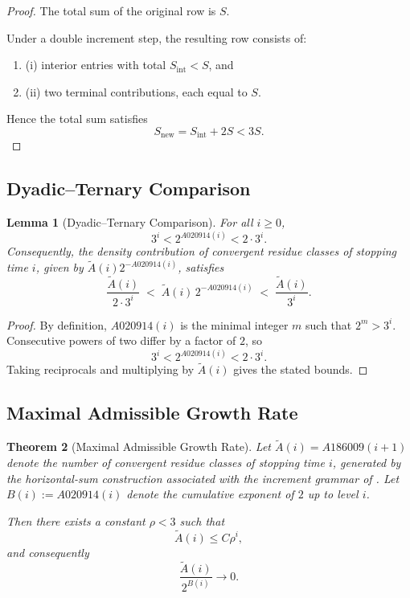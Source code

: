 \documentclass[12pt, oneside]{article}
\numberwithin{equation}{section}
\theoremstyle{definition}
\theoremstyle{plain}
\newtheorem{theorem}{Theorem}[section]
\newtheorem{lemma}[theorem]{Lemma}
\theoremstyle{remark}
\begin{document}
\newpage
\begin{proof}
The total sum of the original row is $S$.

Under a double increment step, the resulting row consists of:
\begin{enumerate}
    \item (i) interior entries with total $S_{\mathrm{int}} < S$, and
    \item (ii) two terminal contributions, each equal to $S$.
\end{enumerate}

Hence the total sum satisfies
\[
S_{\mathrm{new}} = S_{\mathrm{int}} + 2S < 3S.
\]
\end{proof}

\subsection{Dyadic–Ternary Comparison}
\begin{lemma}[Dyadic–Ternary Comparison]
\label{lem:uniform-control}
For all $i \ge 0$,
\[
3^i < 2^{A020914(i)} < 2\cdot 3^i.
\]
Consequently, the density contribution of convergent residue classes of
stopping time $i$, given by \(\widetilde A(i) 2^{-A020914(i)}\), satisfies
\[
\frac{\widetilde A(i)}{2 \cdot 3^i}
\;<\;
\widetilde A(i)\,2^{-A020914(i)}
\;<\;
\frac{\widetilde A(i)}{3^i}.
\]
\end{lemma}

\begin{proof}
By definition, $A020914(i)$ is the minimal integer $m$ such that $2^m > 3^i$.
Consecutive powers of two differ by a factor of $2$, so
\[
3^i < 2^{A020914(i)} < 2 \cdot 3^i.
\]
Taking reciprocals and multiplying by $\widetilde A(i)$ gives the stated bounds.
\end{proof}

\subsection{Maximal Admissible Growth Rate}
\begin{theorem}[Maximal Admissible Growth Rate]
\label{thm:maximal-growth}
Let $\widetilde A(i) = A186009(i+1)$ denote the number of convergent residue classes
of stopping time $i$, generated by the horizontal-sum construction associated with
the increment grammar of .  Let $B(i) := A020914(i)$ denote the
cumulative exponent of $2$ up to level $i$.  

Then there exists a constant $\rho < 3$ such that
\[
\widetilde A(i) \le C \rho^i,
\]
and consequently
\[
\frac{\widetilde A(i)}{2^{B(i)}} \to 0.
\]
\end{theorem}
\end{document}
